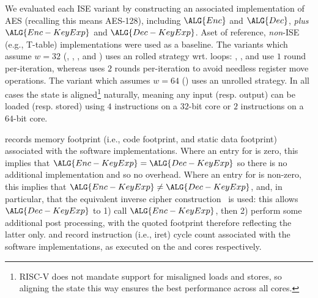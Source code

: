 
We evaluated each ISE variant by constructing an associated implementation
of AES (recalling this means AES-128), including
$\ALG{Enc}$
and
$\ALG{Dec}$,
{\em plus}
$\ALG{Enc-KeyExp}$
and
$\ALG{Dec-KeyExp}$.
Aset of reference, {\em non}-ISE 
(e.g., T-table) 
implementations were used as a baseline.
The variants which assume  $w = 32$
(, ,     , and )
uses an   rolled strategy wrt. loops:
 , ,              and 
use  $1$ round  per-iteration,
whereas
uses $2$ rounds per-iteration
to avoid needless register move operations.
The variant  which assumes $w = 64$
()
uses an unrolled strategy.
In all cases the state is aligned\footnote{%
RISC-V does not mandate support for misaligned loads and stores, so
aligning the state this way ensures the best performance across all
cores.
} naturally, meaning any input (resp. output) can be loaded (resp. stored) 
using 
$4$  instructions on a $32$-bit core
or
$2$  instructions on a $64$-bit core.

records
memory footprint (i.e., code footprint, and static data footprint)
associated with the software implementations.
Where an entry for
is     zero, this implies that
$\ALG{Enc-KeyExp} =    \ALG{Dec-KeyExp}$
so there is no additional implementation and so no overhead.
Where an entry for
is non-zero, this implies that
$\ALG{Enc-KeyExp} \neq \ALG{Dec-KeyExp}$,
and, in particular, that the equivalent inverse cipher construction~\cite[Section 5.3.5]{FIPS:197}
is used: this allows $\ALG{Dec-KeyExp}$ to
1) call $\ALG{Enc-KeyExp}$,
   then
2) perform some additional post processing,
with the quoted footprint therefore reflecting the latter only.  
and
record
instruction (i.e., iret) cycle count
associated with the software implementations,
as executed on the  and  cores respectively.

